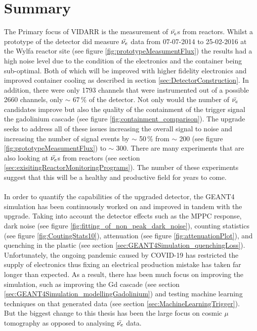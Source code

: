 
\chapter{Summary}

\ifpdf
    \graphicspath{{Chapter7/Figs/Raster/}{Chapter6/Figs/PDF/}{Chapter6/Figs/}}
\else
    \graphicspath{{Chapter7/Figs/Vector/}{Chapter7/Figs/}}
\fi

The Primary focus of VIDARR is the measurement of $\Bar{\nu_e}$s from reactors. Whilst a prototype of the detector did measure $\Bar{\nu_e}$ data from 07-07-2014 to 25-02-2016 at the Wylfa reactor site (see figure \ref{fig:prototypeMeasumentFlux}) the results had a high noise level due to the condition of the electronics and the container being sub-optimal. Both of which will be improved with higher fidelity electronics and improved container cooling as described in section \ref{sec:DetectorConstruction}. In addition, there were only 1793 channels that were instrumented out of a possible 2660 channels, only $\sim$ 67\,\% of the detector. Not only would the number of $\Bar{\nu_e}$ candidates improve but also the quality of the containment of the trigger signal the gadolinium cascade (see figure \ref{fig:containment_comparison}). The upgrade seeks to address all of these issues increasing the overall signal to noise and increasing the number of signal events by $\sim$ 50\,\% from $\sim$ 200 (see figure \ref{fig:prototypeMeasumentFlux}) to $\sim$ 300. There are many experiments that are also looking at $\Bar{\nu_e}$s from reactors (see section \ref{sec:exisitingReactorMonitoringPrograms}). The number of these experiments suggest that this will be a healthy and productive field for years to come.
\\\\In order to quantify the capabilities of the upgraded detector, the GEANT4 simulation has been continuously worked on and improved in tandem with the upgrade. Taking into account the detector effects such as the MPPC response, dark noise (see figure \ref{fig:fitting_of_non_peak_dark_noise}), counting statistics (see figure \ref{fig:CoutingStats10}), attenuation (see figure \ref{fig:attenuationPlot}), and quenching in the plastic (see section \ref{sec:GEANT4Simulation_quenchingLoss}). Unfortunately, the ongoing pandemic caused by COVID-19 has restricted the supply of electronics thus fixing an electrical production mistake has taken far longer than expected. As a result, there has been much focus on improving the simulation, such as improving the Gd cascade (see section \ref{sec:GEANT4Simulation_modellingGadolinium}) and testing machine learning techniques on that generated data (see section \ref{sec:MachineLearningTrigger}). But the biggest change to this thesis has been the large focus on cosmic $\mu$ tomography as opposed to analysing $\Bar{\nu_e}$ data.
